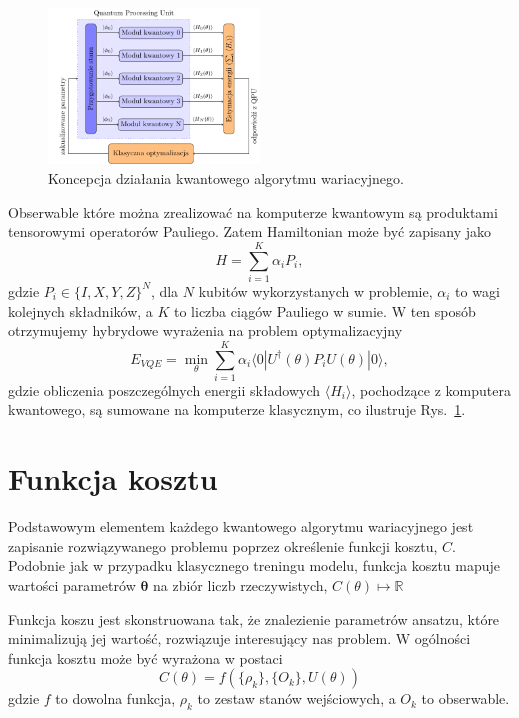 \documentclass[a4paper,11pt]{article}
\newcommand{\ket}[1]{| #1 \rangle}
\newcommand{\bra}[1]{\langle #1 |}
\newcommand{\R}{\mathbb{R}}
\begin{document}
\begin{figure}[ht!]
	\centering
	\includegraphics[width=0.5\textwidth]{vqe-pl.pdf}
	\caption{Koncepcja działania kwantowego algorytmu wariacyjnego.}
	\label{fig:koncepcja-vqe}
\end{figure}

Obserwable które można zrealizować na komputerze kwantowym są produktami tensorowymi operatorów Pauliego. Zatem Hamiltonian może być zapisany jako
\begin{equation}
	H = \sum_{i=1}^K \alpha_i P_i,
\end{equation}
gdzie $P_i\in \{I,X,Y,Z\}^N$, dla $N$ kubitów wykorzystanych w problemie, $\alpha_i$ to wagi kolejnych składników, a $K$ to liczba ciągów Pauliego w sumie.  W ten sposób otrzymujemy hybrydowe wyrażenia na problem optymalizacyjny
\begin{equation}
	E_{VQE} =  \min_\theta \sum_{i=1}^K \alpha_i  \bra{0} U^\dagger(\theta) P_i U(\theta)\ket{0},
\end{equation}	
gdzie obliczenia poszczególnych energii składowych $\langle H_i \rangle$, pochodzące z komputera kwantowego, są sumowane na komputerze klasycznym, co ilustruje Rys.~\ref{fig:koncepcja-vqe}.
\hypertarget{funkcja-kosztu}{%
	\section{Funkcja kosztu}\label{funkcja-kosztu}}

Podstawowym elementem każdego kwantowego algorytmu wariacyjnego jest zapisanie rozwiązywanego problemu poprzez określenie funkcji kosztu, $C$. Podobnie jak w przypadku klasycznego treningu modelu, funkcja kosztu mapuje wartości parametrów $\mathbf{\theta}$ na zbiór liczb rzeczywistych, $C(\theta)\mapsto \R$


Funkcja koszu jest skonstruowana tak, że znalezienie parametrów ansatzu, które minimalizują jej wartość, rozwiązuje interesujący nas problem.  W ogólności funkcja kosztu może być wyrażona w postaci
\begin{equation}
	C(\theta)  = f(\{\rho_k\}, \{O_k\}, U(\theta))
\end{equation}
gdzie $f$ to dowolna funkcja, $\rho_k$ to zestaw stanów wejściowych, a $O_k$ to obserwable.
\end{document}
